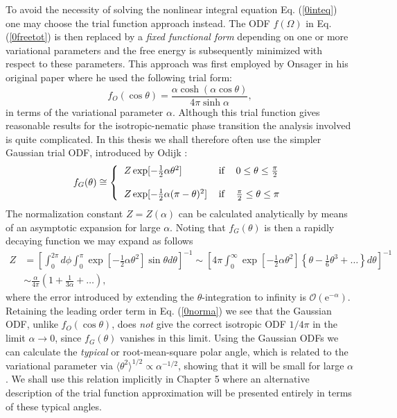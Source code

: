 \documentclass[amssymb]{revtex4}
\begin{document}
To avoid the necessity of solving the nonlinear integral equation Eq. (\ref{0inteq}) one may
choose the trial function approach instead. The ODF $f(\Omega)$ in Eq. (\ref{0freetot}) is then 
replaced by a {\em fixed functional form}
depending on one or more variational parameters and the free energy is subsequently minimized
with respect to these parameters.
This approach was first employed by Onsager  in his original paper \cite{Onsager} where he used the following
trial form:
\begin{equation}
f_{O}(\cos \theta) =\frac{\alpha \cosh (\alpha \cos\theta)}{4\pi\sinh \alpha},
\end{equation}
in terms of the variational parameter $\alpha$.
Although this trial function gives reasonable results for the isotropic-nematic
phase transition the analysis involved is
quite complicated.
In this thesis we shall therefore often use the simpler Gaussian trial ODF, introduced
by Odijk \cite{OdijkLekkerkerker}:
\begin{equation}
f_{G}(\theta ) \cong   \left\{ 
\begin{tabular}{lll}
$Z\exp [-\frac{1}{2}\alpha\theta ^{2}]$ & if & $%
0\leq \theta \leq \frac{\pi }{2}$ \\ 
&  &  \\ 
$Z\exp [-\frac{1}{2}\alpha (\pi -\theta )^{2}]$
& if & $\frac{\pi}{2}\leq \theta \leq \pi $%
\end{tabular}
\right.  \label{0ODF}
\end{equation}
The normalization constant $Z=Z(\alpha)$ can be calculated analytically 
by means of an asymptotic expansion for large $\alpha$. Noting
that $f_{G}(\theta)$ is then a rapidly decaying function we may expand as follows
\begin{align}
Z&=\left[\int_{0}^{2\pi} d \phi \int _{0}^{\pi} \exp \left[-\frac{1}{2}\alpha\theta ^{2}\right] \sin\theta d\theta\right]^{-1} 
\sim \left[ 4\pi \int _{0}^{\infty} \exp \left[-\frac{1}{2}\alpha\theta ^{2}\right]\left\{ \theta - \frac{1}{6} \theta ^{3}+\ldots \right \}
 d\theta  \right]^{-1} \nonumber \\
&\sim \frac{\alpha}{4\pi}\left(1+\frac{1}{3\alpha}+\ldots \right), \label{0norma}
\end{align}  
where the error introduced by extending  the $\theta$-integration  to infinity is $\mathcal{O}
(\text{e}^{-\alpha})$. Retaining the leading order term in Eq. (\ref{0norma}) we see that
the Gaussian ODF, unlike $f_{O}(\cos\theta)$, 
does {\em not} give the correct isotropic ODF $1/4\pi$ in the limit $\alpha \rightarrow 0$, since $f_{G}(\theta)$ 
vanishes in this limit. Using the Gaussian ODFs
we can calculate the {\em typical} or root-mean-square polar angle, which is related to the variational parameter  
via $\langle\theta^{2}\rangle^{1/2}\propto  \alpha^{-1/2}$, showing that it
will be small for large $\alpha$. We shall  use this relation implicitly in Chapter 5
where  an alternative description of the trial function approximation will be presented
 entirely in terms of these typical angles.
\end{document}
